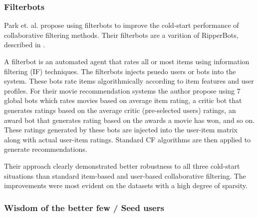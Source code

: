 


\subsubsection{Filterbots}


Park et. al. \cite{Park2006} propose using filterbots to improve the cold-start
performance of collaborative filtering methods. Their filterbots are a varition of RipperBots, described in \cite{Good1999}.

A filterbot is an automated agent that rates all or most items using information filtering (IF) techniques. The filterbots injects psuedo
users or bots into the system. These bots rate items algorithmically according to item features and user profiles. For their movie recommendation systems the author propose using 7 global bots which rates movies based on average item rating, a critic bot that generates ratings based on the average critic (pre-selected users) ratings, an award bot that generates rating based on the awards a movie has won, and so on. These ratings generated by these bots are injected into the user-item matrix along with actual user-item ratings. Standard CF algorithms are then applied to generate
recommendations.

Their approach clearly demonstrated better robustness to all three cold-start situations than standard item-based
and user-based collaborative filtering. The improvements were most evident on
the datasets with a high degree of sparsity.


\subsubsection{Wisdom of the better few / Seed users}


